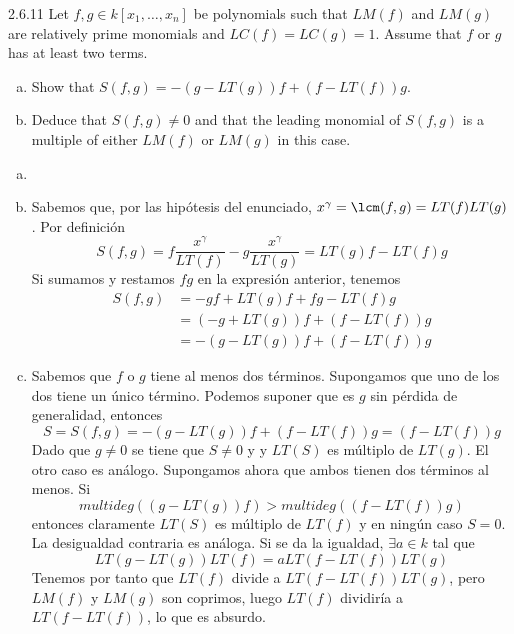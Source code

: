 \documentclass[twoside]{article}
\begin{document}
\begin{ejercicio}{2.6.11}
Let $f , g ∈ k[x_1,\dots , x_n]$ be polynomials such that $LM( f )$ and $LM(g)$ are relatively prime
monomials and $LC( f) = LC(g) = 1$. Assume that $f$ or $g$ has at least two terms.
\begin{enumerate}[a.]
\item Show that $S( f , g) = −(g − LT(g))f + (f − LT( f ))g$.
\item Deduce that $S( f , g) \neq 0$ and that the leading monomial of $S( f , g)$ is a multiple of
either $LM( f )$ or $LM(g)$ in this case.
\end{enumerate}
\end{ejercicio}
\begin{solucion}
\begin{enumerate}[a.]
\item[]
\item Sabemos que, por las hipótesis del enunciado, $x^\gamma=\lcm(f,g)=LT(f)LT(g)$. Por definición
$$S(f,g)=f\frac{x^{\gamma}}{LT(f)}-g\frac{x^{\gamma}}{LT(g)} = LT(g)f-LT(f)g
$$
Si sumamos y restamos $fg$ en la expresión anterior, tenemos
\begin{align*}
S(f,g)&=-gf+LT(g)f +fg-LT(f)g\\
&=(-g+LT(g))f+(f-LT(f))g \\
&=-(g-LT(g))f+(f-LT(f))g
\end{align*}
\item Sabemos que $f$ o $g$ tiene al menos dos términos. Supongamos que uno de los dos tiene un único término. Podemos suponer que es $g$ sin pérdida de generalidad, entonces
$$
S=S(f,g)=-(g-LT(g))f+(f-LT(f))g = (f-LT(f))g 
$$
Dado que $g\neq 0$ se tiene que $S\neq 0$ y y $LT(S)$ es múltiplo de $LT(g)$. El otro caso es análogo. Supongamos ahora que ambos tienen dos términos al menos. Si $$multideg((g-LT(g))f)>multideg((f-LT(f))g)$$ entonces claramente $LT(S)$ es múltiplo de $LT(f)$ y en ningún caso $S=0$. La desigualdad contraria es análoga. Si se da la igualdad, $\exists a \in k$ tal que
$$
LT(g-LT(g))LT(f) = a LT(f-LT(f))LT(g)
$$
Tenemos por tanto que $LT(f)$ divide a $LT(f-LT(f))LT(g)$, pero $LM(f)$ y $LM(g)$ son coprimos, luego $LT(f)$ dividiría a $LT(f-LT(f))$, lo que es absurdo.
\end{enumerate}
\end{solucion}

\newpage
\end{document}
